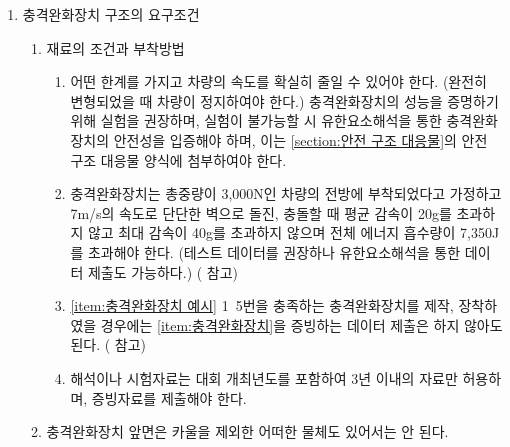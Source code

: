 \documentclass[final,a4paper,10pt]{report}
\begin{document}
\begin{enumerate}
  \item\label{rule:formula-technical.impact-attenuator.structure} 충격완화장치 구조의 요구조건 \label{item:충격완화장치}
    \begin{enumerate}
      \item\label{rule:formula-technical.impact-attenuator.structure.material-and-attachment} 재료의 조건과 부착방법
        \begin{enumerate}
          \item\label{rule:formula-technical.impact-attenuator.structure.material-and-attachment.stopping-capability} 어떤 한계를 가지고 차량의 속도를 확실히 줄일 수 있어야 한다. (완전히 변형되었을 때 차량이 정지하여야 한다.) 충격완화장치의 성능을 증명하기 위해 실험을 권장하며, 실험이 불가능할 시 유한요소해석을 통한 충격완화장치의 안전성을 입증해야 하며, 이는 \ref{section:안전 구조 대응물}의 안전 구조 대응물 양식에 첨부하여야 한다.
          \item\label{rule:formula-technical.impact-attenuator.structure.material-and-attachment.crash-test-thresholds} 충격완화장치는 총중량이 3,000N인 차량의 전방에 부착되었다고 가정하고 7m/s의 속도로 단단한 벽으로 돌진, 충돌할 때 평균 감속이 20g를 초과하지 않고 최대 감속이 40g를 초과하지 않으며 전체 에너지 흡수량이 7,350J를 초과해야 한다. (테스트 데이터를 권장하나 유한요소해석을 통한 데이터 제출도 가능하다.) ( 참고)
          \item\label{rule:formula-technical.impact-attenuator.structure.material-and-attachment.exempt-if-reference-design} \ref{item:충격완화장치 예시} 1\string~5번을 충족하는 충격완화장치를 제작, 장착하였을 경우에는 \ref{item:충격완화장치}을 증빙하는 데이터 제출은 하지 않아도 된다. ( 참고)
          \item\label{rule:formula-technical.impact-attenuator.structure.material-and-attachment.data-valid-3yr-window} 해석이나 시험자료는 대회 개최년도를 포함하여 3년 이내의 자료만 허용하며, 증빙자료를 제출해야 한다.

        \end{enumerate}
      \item\label{rule:formula-technical.impact-attenuator.structure.front-face-no-obstruction} 충격완화장치 앞면은 카울을 제외한 어떠한 물체도 있어서는 안 된다.
    \end{enumerate}


\end{enumerate}
\end{document}

